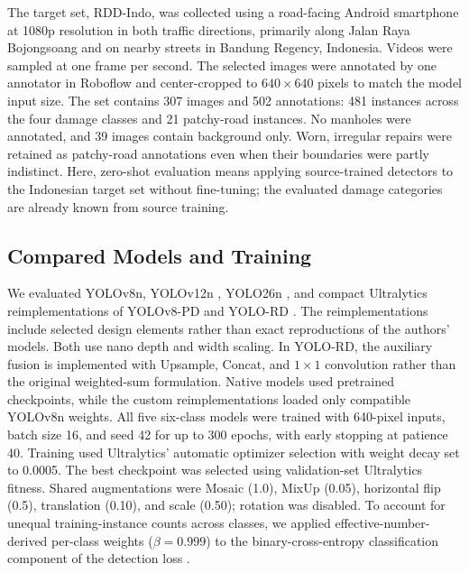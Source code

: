 \documentclass[conference]{IEEEtran}
\begin{document}
The target set, RDD-Indo, was collected using a road-facing Android smartphone at 1080p resolution in both traffic directions, primarily along Jalan Raya Bojongsoang and on nearby streets in Bandung Regency, Indonesia. Videos were sampled at one frame per second. The selected images were annotated by one annotator in Roboflow and center-cropped to $640 \times 640$ pixels to match the model input size. The set contains 307 images and 502 annotations: 481 instances across the four damage classes and 21 patchy-road instances. No manholes were annotated, and 39 images contain background only. Worn, irregular repairs were retained as patchy-road annotations even when their boundaries were partly indistinct. Here, zero-shot evaluation means applying source-trained detectors to the Indonesian target set without fine-tuning; the evaluated damage categories are already known from source training.

\subsection{Compared Models and Training}



We evaluated YOLOv8n, YOLOv12n \cite{tian2025yolov12_primary}, YOLO26n \cite{sapkota2025yolo26_primary}, and compact Ultralytics reimplementations of YOLOv8-PD and YOLO-RD \cite{Zeng2024,Wang2025}. The reimplementations include selected design elements rather than exact reproductions of the authors' models. Both use nano depth and width scaling. In YOLO-RD, the auxiliary fusion is implemented with Upsample, Concat, and $1 \times 1$ convolution rather than the original weighted-sum formulation. Native models used pretrained checkpoints, while the custom reimplementations loaded only compatible YOLOv8n weights. All five six-class models were trained with 640-pixel inputs, batch size 16, and seed 42 for up to 300 epochs, with early stopping at patience 40. Training used Ultralytics' automatic optimizer selection with weight decay set to 0.0005. The best checkpoint was selected using validation-set Ultralytics fitness. Shared augmentations were Mosaic (1.0), MixUp (0.05), horizontal flip (0.5), translation (0.10), and scale (0.50); rotation was disabled. To account for unequal training-instance counts across classes, we applied effective-number-derived per-class weights ($\beta=0.999$) to the binary-cross-entropy classification component of the detection loss \cite{cui2019class}.
\end{document}
